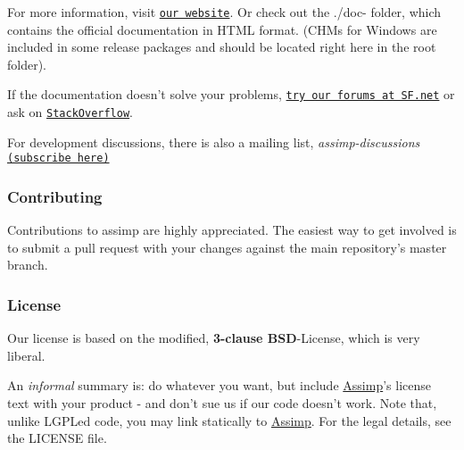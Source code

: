 For more information, visit \href{http://assimp.sourceforge.net/}{\tt our website}. Or check out the {\ttfamily ./doc}-\/ folder, which contains the official documentation in H\+T\+M\+L format. (C\+H\+Ms for Windows are included in some release packages and should be located right here in the root folder).

If the documentation doesn't solve your problems, \href{http://sourceforge.net/p/assimp/discussion/817654}{\tt try our forums at S\+F.\+net} or ask on \href{http://stackoverflow.com/questions/tagged/assimp?sort=newest}{\tt Stack\+Overflow}.

For development discussions, there is also a mailing list, {\itshape assimp-\/discussions} \href{https://lists.sourceforge.net/lists/listinfo/assimp-discussions}{\tt (subscribe here)}

\subsubsection*{Contributing}

Contributions to assimp are highly appreciated. The easiest way to get involved is to submit a pull request with your changes against the main repository's {\ttfamily master} branch.

\subsubsection*{License}

Our license is based on the modified, {\bfseries 3-\/clause B\+S\+D}-\/\+License, which is very liberal.

An {\itshape informal} summary is\+: do whatever you want, but include \hyperlink{class_assimp}{Assimp}'s license text with your product -\/ and don't sue us if our code doesn't work. Note that, unlike L\+G\+P\+Led code, you may link statically to \hyperlink{class_assimp}{Assimp}. For the legal details, see the {\ttfamily L\+I\+C\+E\+N\+S\+E} file. 